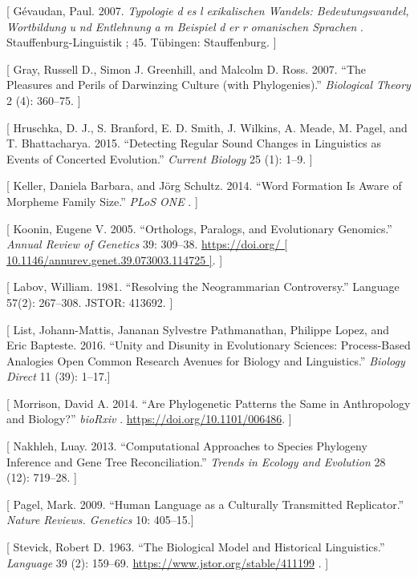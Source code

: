 \documentclass[
  a4paper,
  14pt,
  oneside,
  tablecaptionabove
]{scrbook}
\begin{document}
{[} Gévaudan, Paul. 2007. \emph{Typologie} \emph{d} \emph{es} \emph{l}
\emph{exikalischen Wandels: Bedeutungswandel, Wortbildung} \emph{u}
\emph{nd Entlehnung} \emph{a} \emph{m Beispiel} \emph{d} \emph{er}
\emph{r} \emph{omanischen Sprachen} . Stauffenburg-Linguistik ; 45.
Tübingen: Stauffenburg. {]}

{[} Gray, Russell D., Simon J. Greenhill, and Malcolm D. Ross. 2007.
\enquote{The Pleasures and Perils of Darwinzing Culture (with
Phylogenies).} \emph{Biological Theory} 2 (4): 360--75. {]}

{[} Hruschka, D. J., S. Branford, E. D. Smith, J. Wilkins, A. Meade, M.
Pagel, and T. Bhattacharya. 2015. \enquote{Detecting Regular Sound
Changes in Linguistics as Events of Concerted Evolution.} \emph{Current
Biology} 25 (1): 1--9. {]}

{[} Keller, Daniela Barbara, and Jörg Schultz. 2014. \enquote{Word
Formation Is Aware of Morpheme Family Size.} \emph{PLoS ONE} . {]}

{[} Koonin, Eugene V. 2005. \enquote{Orthologs, Paralogs, and
Evolutionary Genomics.} \emph{Annual Review of Genetics} 39: 309--38.
\href{https://doi.org/10.1146/annurev.genet.39.073003.114725}{https://doi.org/
{[} 10.1146/annurev.genet.39.073003.114725 {]}}. {]}

{[} Labov, William. 1981. \enquote{Resolving the Neogrammarian
Controversy.} Language 57(2): 267--308. JSTOR: 413692. {]}

{[} List, Johann-Mattis, Jananan Sylvestre Pathmanathan, Philippe Lopez,
and Eric Bapteste. 2016. \enquote{Unity and Disunity in Evolutionary
Sciences: Process-Based Analogies Open Common Research Avenues for
Biology and Linguistics.} \emph{Biology Direct} 11 (39): 1--17.{]}

{[} Morrison, David A. 2014. \enquote{Are Phylogenetic Patterns the Same
in Anthropology and Biology?} \emph{bioRxiv} .
\url{https://doi.org/10.1101/006486}. {]}

{[} Nakhleh, Luay. 2013. \enquote{Computational Approaches to Species
Phylogeny Inference and Gene Tree Reconciliation.} \emph{Trends in
Ecology and Evolution} 28 (12): 719--28. {]}

{[} Pagel, Mark. 2009. \enquote{Human Language as a Culturally
Transmitted Replicator.} \emph{Nature Reviews. Genetics} 10: 405--15.{]}

{[} Stevick, Robert D. 1963. \enquote{The Biological Model and
Historical Linguistics.} \emph{Language} 39 (2): 159--69.
\url{https://www.jstor.org/stable/411199} . {]}
\end{document}
